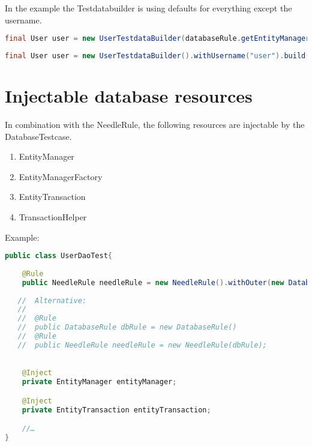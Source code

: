 In the example the Testdatabuilder is using defaults for everything except the username.

\begin{lstlisting}[language={JAVA},caption=Build an persistent User object]
final User user = new UserTestdataBuilder(databaseRule.getEntityManager()).withUsername("user").buildAndSave();
\end{lstlisting}

\begin{lstlisting}[language={JAVA},caption=Build an transient User object]
final User user = new UserTestdataBuilder().withUsername("user").build()
\end{lstlisting}

\section{Injectable database resources}

In combination with the NeedleRule, the following resources are injectable by the DatabaseTestcase.

\begin{enumerate}
\item EntityManager
\item EntityManagerFactory
\item EntityTransaction
\item TransactionHelper
\end{enumerate}

Example:

\begin{lstlisting}[language={JAVA},caption=Injectable database resources]
public class UserDaoTest{
    
    @Rule
    public NeedleRule needleRule = new NeedleRule().withOuter(new DatabaseRule());
    
   //  Alternative:
   // 
   //  @Rule
   //  public DatabaseRule dbRule = new DatabaseRule()
   //  @Rule
   //  public NeedleRule needleRule = new NeedleRule(dbRule);
   

    @Inject
    private EntityManager entityManager;

    @Inject
    private EntityTransaction entityTransaction;

    //…
}
\end{lstlisting}

